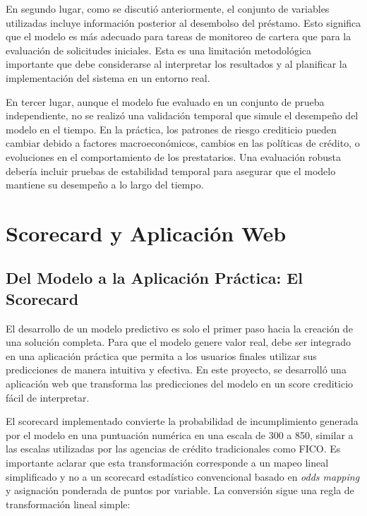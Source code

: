 \documentclass[12pt,a4paper]{article}
\begin{document}
En segundo lugar, como se discutió anteriormente, el conjunto de variables utilizadas incluye información posterior al desembolso del préstamo. Esto significa que el modelo es más adecuado para tareas de monitoreo de cartera que para la evaluación de solicitudes iniciales. Esta es una limitación metodológica importante que debe considerarse al interpretar los resultados y al planificar la implementación del sistema en un entorno real.

En tercer lugar, aunque el modelo fue evaluado en un conjunto de prueba independiente, no se realizó una validación temporal que simule el desempeño del modelo en el tiempo. En la práctica, los patrones de riesgo crediticio pueden cambiar debido a factores macroeconómicos, cambios en las políticas de crédito, o evoluciones en el comportamiento de los prestatarios. Una evaluación robusta debería incluir pruebas de estabilidad temporal para asegurar que el modelo mantiene su desempeño a lo largo del tiempo.

\section{Scorecard y Aplicación Web}

\subsection{Del Modelo a la Aplicación Práctica: El Scorecard}

El desarrollo de un modelo predictivo es solo el primer paso hacia la creación de una solución completa. Para que el modelo genere valor real, debe ser integrado en una aplicación práctica que permita a los usuarios finales utilizar sus predicciones de manera intuitiva y efectiva. En este proyecto, se desarrolló una aplicación web que transforma las predicciones del modelo en un score crediticio fácil de interpretar.

El scorecard implementado convierte la probabilidad de incumplimiento generada por el modelo en una puntuación numérica en una escala de 300 a 850, similar a las escalas utilizadas por las agencias de crédito tradicionales como FICO. Es importante aclarar que esta transformación corresponde a un mapeo lineal simplificado y no a un scorecard estadístico convencional basado en \textit{odds mapping} y asignación ponderada de puntos por variable. La conversión sigue una regla de transformación lineal simple:
\end{document}
